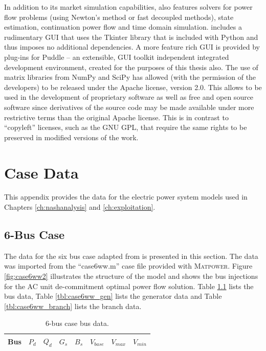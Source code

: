 In addition to its market simulation capabilities, \pylon also features solvers
for power flow problems (using Newton's method or fast decoupled methods),
state estimation, continuation power flow and time domain simulation.  \pylon
includes a rudimentary GUI that uses the Tkinter library that is included
with Python and thus imposes no additional dependencies.  A more feature
rich GUI is provided by plug-ins for Puddle -- an extensible, GUI
toolkit independent integrated development environment, created for the
purposes of this thesis also.  The use of matrix libraries from NumPy and
SciPy has allowed \pylon (with the permission of the \matpower developers) to
be released under the Apache license, version 2.0. This allows \pylon to be
used in the development of proprietary software as well as free and open
source software since derivatives of the source code may be made available
under more restrictive terms than the original Apache license.  This is in
contrast to ``copyleft'' licenses, such as the GNU GPL, that require the same
rights to be preserved in modified versions of the work.

\chapter{Case Data}
This appendix provides the data for the electric power system models used in
Chapters \ref{ch:nashanalysis} and \ref{ch:exploitation}.

\section{6-Bus Case}
\label{adx:case6ww}
The data for the six bus case adapted from  is presented in this section.  The data was imported from the
``case6ww.m'' case file provided with \textsc{Matpower}.  Figure
\ref{fig:case6ww2} illustrates the structure of the model and shows the bus
injections for the AC unit de-commitment optimal power flow solution.  Table
\ref{tbl:case6ww_bus} lists the bus data, Table \ref{tbl:case6ww_gen} lists
the generator data and Table \ref{tbl:case6ww_branch} lists the branch data.


\begin{table}[h]
\begin{center}
\begin{tabular}{c|c|c|c|c|c|c|c}
\hline
Bus &$P_d$ &$Q_d$ &$G_s$ &$B_s$ &$V_{base}$ &$V_{max}$ &$V_{min}$\\
\hline\hline

\hline
\end{tabular}
\caption{6-bus case bus data.}
\label{tbl:case6ww_bus}
\end{center}
\end{table}

